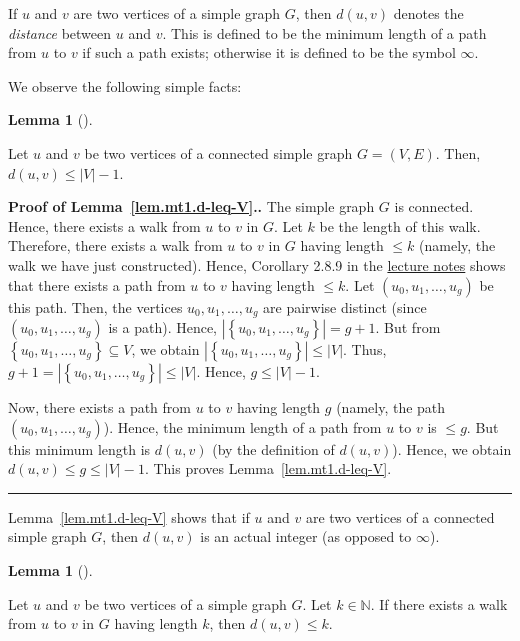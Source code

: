\documentclass[numbers=enddot,12pt,final,onecolumn,notitlepage]{scrartcl}%
\theoremstyle{definition}
\newtheorem{lem}[theo]{Lemma}
\newenvironment{lemma}[1][]
{\begin{lem}[#1]\begin{leftbar}}
{\end{leftbar}\end{lem}}
\newenvironment{proof}[1][Proof]{\noindent\textbf{#1.} }{\ \rule{0.5em}{0.5em}}
\newcommand{\NN}{\mathbb{N}}
\newcommand{\set}[1]{\left\{ #1 \right\}}
\newcommand{\abs}[1]{\left| #1 \right|}
\newcommand{\tup}[1]{\left( #1 \right)}
\begin{document}
If $u$ and $v$ are two vertices of a simple graph $G$, then
$d \tup{u, v}$ denotes the \textit{distance} between $u$ and $v$. This
is defined to be the minimum length of a path from $u$ to $v$ if
such a path exists; otherwise it is defined to be the symbol $\infty$.

We observe the following simple facts:

\begin{lemma} \label{lem.mt1.d-leq-V}
Let $u$ and $v$ be two vertices of a connected simple graph
$G = \tup{V, E}$.
Then, $d \tup{u, v} \leq \abs{V} - 1$.
\end{lemma}

\begin{proof}[Proof of Lemma~\ref{lem.mt1.d-leq-V}.]
The simple graph $G$ is connected. Hence, there exists a walk from $u$
to $v$ in $G$. Let $k$ be the length of this walk. Therefore, there
exists a walk from $u$ to $v$ in $G$ having length $\leq k$ (namely,
the walk we have just constructed).
Hence, Corollary 2.8.9 in the
\href{http://www.cip.ifi.lmu.de/~grinberg/t/17s/nogra.pdf}{lecture notes}
shows that there exists a path from $u$ to $v$ having length
$\leq k$. Let $\tup{u_0, u_1, \ldots, u_g}$ be this path. Then, the
vertices $u_0, u_1, \ldots, u_g$ are pairwise distinct (since
$\tup{u_0, u_1, \ldots, u_g}$ is a path). Hence,
$\abs{\set{u_0, u_1, \ldots, u_g}} = g+1$. But from
$\set{u_0, u_1, \ldots, u_g} \subseteq V$, we obtain
$\abs{\set{u_0, u_1, \ldots, u_g}} \leq \abs{V}$. Thus,
$g + 1 = \abs{\set{u_0, u_1, \ldots, u_g}} \leq \abs{V}$.
Hence, $g \leq \abs{V} - 1$.

Now, there exists a path from $u$ to $v$ having length $g$ (namely,
the path $\tup{u_0, u_1, \ldots, u_g}$). Hence, the minimum length of
a path from $u$ to $v$ is $\leq g$. But this minimum length is
$d \tup{u, v}$ (by the definition of $d \tup{u, v}$). Hence, we obtain
$d \tup{u, v} \leq g \leq \abs{V} - 1$. This proves
Lemma~\ref{lem.mt1.d-leq-V}.
\end{proof}

Lemma~\ref{lem.mt1.d-leq-V} shows that if $u$ and $v$ are two
vertices of a connected simple graph $G$, then $d \tup{u, v}$ is an
actual integer (as opposed to $\infty$).

\begin{lemma} \label{lem.mt1.walk-to-distance}
Let $u$ and $v$ be two vertices of a simple graph $G$. Let
$k \in \NN$. If there exists a walk from $u$ to $v$ in $G$ having
length $k$, then $d \tup{u, v} \leq k$.
\end{lemma}
\end{document}
